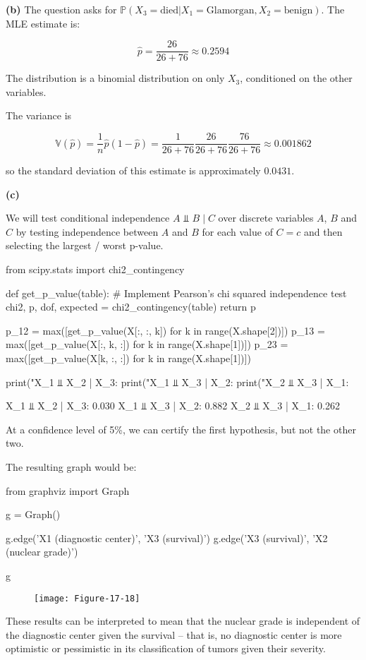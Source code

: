 \textbf{(b)} The question asks for
\(\mathbb{P}( X_3 = \text{died} | X_1 = \text{Glamorgan}, X_2 = \text{benign})\).
The MLE estimate is:

\[\hat{p} = \frac{26}{26 + 76} \approx 0.2594\]

The distribution is a binomial distribution on only \(X_3\), conditioned
on the other variables.

The variance is

\[\mathbb{V}(\hat{p}) = \frac{1}{n}\hat{p} (1 - \hat{p}) = \frac{1}{26 + 76} \frac{26}{26 + 76} \frac{76}{26 + 76}  \approx 0.001862\]

so the standard deviation of this estimate is approximately \(0.0431\).

\textbf{(c)}

We will test conditional independence \(A \text{ ⫫ } B \;|\; C\) over
discrete variables \(A\), \(B\) and \(C\) by testing independence
between \(A\) and \(B\) for each value of \(C = c\) and then selecting
the largest / worst p-value.

\begin{python}
from scipy.stats import chi2_contingency

def get_p_value(table):
    # Implement Pearson's chi squared independence test
    chi2, p, dof, expected = chi2_contingency(table)
    return p
\end{python}

\begin{python}
p_12 = max([get_p_value(X[:, :, k]) for k in range(X.shape[2])])
p_13 = max([get_p_value(X[:, k, :]) for k in range(X.shape[1])])
p_23 = max([get_p_value(X[k, :, :]) for k in range(X.shape[1])])

print("X_1 ⫫ X_2 | X_3:  %
print("X_1 ⫫ X_3 | X_2:  %
print("X_2 ⫫ X_3 | X_1:  %
\end{python}

\begin{console}
X\_1 ⫫ X\_2 | X\_3:  0.030
X\_1 ⫫ X\_3 | X\_2:  0.882
X\_2 ⫫ X\_3 | X\_1:  0.262
\end{console}

At a confidence level of 5\%, we can certify the first hypothesis, but
not the other two.

The resulting graph would be:

\begin{python}
from graphviz import Graph

g = Graph()

g.edge('X1 (diagnostic center)', 'X3 (survival)')
g.edge('X3 (survival)', 'X2 (nuclear grade)')

g
\end{python}

\begin{figure}[H]
\texttt{[image: Figure-17-18]}
\end{figure}

These results can be interpreted to mean that the nuclear grade is
independent of the diagnostic center given the survival -- that is, no
diagnostic center is more optimistic or pessimistic in its
classification of tumors given their severity.
